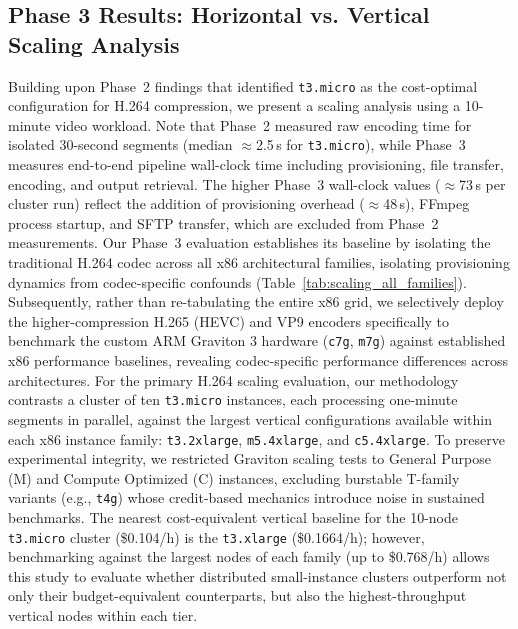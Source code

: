 \documentclass[conference]{IEEEtran}
\begin{document}
\subsection{Phase 3 Results: Horizontal vs. Vertical Scaling Analysis}

Building upon Phase~2 findings that identified \texttt{t3.micro} as the
cost-optimal configuration for H.264 compression, we present a scaling
analysis using a 10-minute video workload. Note that Phase~2 measured raw encoding
time for isolated 30-second segments (median $\approx$2.5\,s for \texttt{t3.micro}),
while Phase~3 measures end-to-end pipeline wall-clock time including provisioning,
file transfer, encoding, and output retrieval. The higher Phase~3 wall-clock values ($\approx$73\,s per
cluster run) reflect the addition of provisioning overhead ($\approx$48\,s), FFmpeg
process startup, and SFTP transfer, which are excluded from Phase~2 measurements. Our Phase~3 evaluation establishes its baseline by isolating the traditional H.264 codec across all x86 architectural families, isolating provisioning dynamics from codec-specific confounds (Table~\ref{tab:scaling_all_families}). Subsequently, rather than re-tabulating the entire x86 grid, we selectively deploy the higher-compression H.265 (HEVC) and VP9 encoders specifically to benchmark the custom ARM Graviton 3 hardware (\texttt{c7g}, \texttt{m7g}) against established x86 performance baselines, revealing codec-specific performance differences across architectures. For the primary H.264 scaling evaluation, our methodology contrasts a cluster of ten
\texttt{t3.micro} instances, each processing one-minute segments in parallel,
against the largest vertical configurations available within each x86 instance
family: \texttt{t3.2xlarge}, \texttt{m5.4xlarge}, and \texttt{c5.4xlarge}. To preserve experimental integrity, we restricted Graviton scaling tests to General Purpose (M) and Compute Optimized (C) instances, excluding burstable T-family variants (e.g., \texttt{t4g}) whose credit-based mechanics introduce noise in sustained benchmarks. The nearest cost-equivalent vertical baseline for the 10-node \texttt{t3.micro}
cluster (\$0.104/h) is the \texttt{t3.xlarge} (\$0.1664/h); however,
benchmarking against the largest nodes of each family (up to \$0.768/h) allows
this study to evaluate whether distributed small-instance clusters outperform
not only their budget-equivalent counterparts, but also the highest-throughput
vertical nodes within each tier.
\end{document}
